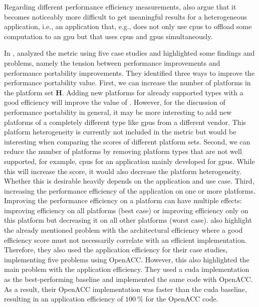 Regarding different performance efficiency measurements, \citet{siklosi_heterogeneous_2018} also argue that it becomes noticeably more difficult to get meaningful results for a heterogeneous application, i.e., an application that, e.g.,  does not only use \glspl{cpu} to offload some computation to an \gls{gpu} but that uses \glspl{cpu} and \glspl{gpu} simultaneously. 

In \citeyear{yokota_beginners_2018}, \citet{yokota_beginners_2018} analyzed the \pp metric using five case studies and highlighted some findings and problems, namely the tension between performance improvements and performance portability improvements. 
They identified three ways to improve the performance portability value. 
First, we can increase the number of platforms in the platform set $\mathbf{H}$. 
Adding new platforms for already supported types with a good efficiency will improve the value of \pp. 
However, for the discussion of performance portability in general, it may be more interesting to add new platforms of a completely different type like \glspl{gpu} from a different vendor. 
This platform heterogeneity is currently not included in the \pp metric but would be interesting when comparing the \pp scores of different platform sets. 
Second, we can reduce the number of platforms by removing platform types that are not well supported, for example, \glspl{cpu} for an application mainly developed for \glspl{gpu}. 
While this will increase the \pp score, it would also decrease the platform heterogeneity. 
Whether this is desirable heavily depends on the application and use case. 
Third, increasing the performance efficiency of the application on one or more platforms. 
Improving the performance efficiency on a platform can have multiple effects: improving efficiency on all platforms (best case) or improving efficiency only on this platform but decreasing it on all other platforms (worst case). 
\citeauthor{yokota_beginners_2018} also highlight the already mentioned problem with the architectural efficiency where a good efficiency score must not necessarily correlate with an efficient implementation.  
Therefore, they also used the application efficiency for their case studies, implementing five problems using OpenACC. 
However, this also highlighted the main problem with the application efficiency. 
They used a \gls{cuda} implementation as the best-performing baseline and implemented the same code with OpenACC. 
As a result, their OpenACC implementation was faster than the \gls{cuda} baseline, resulting in an application efficiency of $\SI{100}{\percent}$ for the OpenACC code. 

